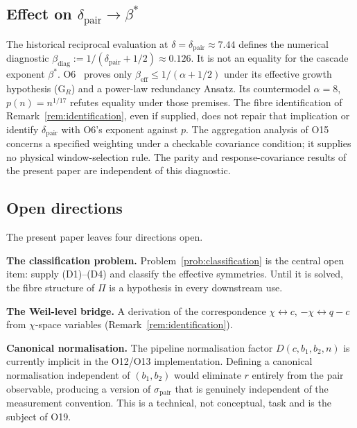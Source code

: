 \documentclass[11pt,a4paper]{article}
\newcommand{\bstar}{\beta^{*}}
\newcommand{\dpair}{\delta_{\mathrm{pair}}}
\newcommand{\Proj}{\Pi}
\newcommand{\chifield}{\chi}
\begin{document}
  \subsection{Effect on $\delta_{\mathrm{pair}} \to \bstar$}
    \label{ssec:dbetastar}

    The historical reciprocal evaluation at $\delta=\dpair\approx7.44$ defines the numerical
    diagnostic $\beta_{\mathrm{diag}}:=1/(\dpair+1/2)\approx0.126$.
    It is not an equality for the cascade exponent $\bstar$.
    O6~\cite{Beau2026a10} proves only $\beta_{\mathrm{eff}}\leq1/(\alpha+1/2)$ under its
    effective growth hypothesis (G$_R$) and a power-law redundancy Ansatz.
    Its countermodel $\alpha=8$, $p(n)=n^{1/17}$ refutes equality under those premises.
    The fibre identification of Remark~\ref{rem:identification}, even if supplied, does not repair
    that implication or identify $\dpair$ with O6's exponent against $p$.
    The aggregation analysis of O15~\cite{Beau2026a19} concerns a specified weighting under a
    checkable covariance condition; it supplies no physical window-selection rule.
    The parity and response-covariance results of the present paper are independent of this diagnostic.

  \subsection{Open directions}
    \label{ssec:open}

    The present paper leaves four directions open.

    \textbf{The classification problem.}
    Problem~\ref{prob:classification} is the central open item: supply (D1)--(D4) and
    classify the effective symmetries.
    Until it is solved, the fibre structure of $\Proj$ is a hypothesis in every downstream
    use.

    \textbf{The Weil-level bridge.}
    A derivation of the correspondence $\chifield \leftrightarrow c$,
    $-\chifield \leftrightarrow q-c$ from $\chifield$-space variables
    (Remark~\ref{rem:identification}).

    \textbf{Canonical normalisation.}
    The pipeline normalisation factor $D(c, b_1, b_2, n)$ is currently implicit in the
    O12/O13 implementation.
    Defining a canonical normalisation independent of $(b_1, b_2)$ would eliminate $r$
    entirely from the pair observable, producing a version of $\sigma_{\mathrm{pair}}$ that
    is genuinely independent of the measurement convention.
    This is a technical, not conceptual, task and is the subject of O19.
\end{document}
